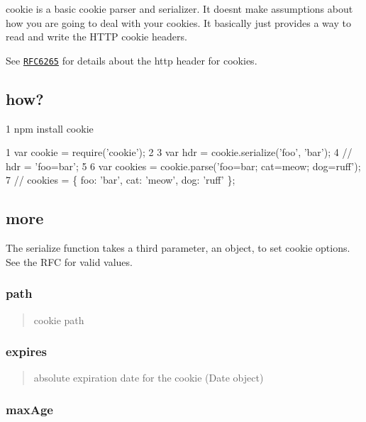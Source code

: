 cookie is a basic cookie parser and serializer. It doesn\textquotesingle{}t make assumptions about how you are going to deal with your cookies. It basically just provides a way to read and write the H\+T\+T\+P cookie headers.

See \href{http://tools.ietf.org/html/rfc6265}{\tt R\+F\+C6265} for details about the http header for cookies.

\subsection*{how?}


\begin{DoxyCode}
1 npm install cookie
\end{DoxyCode}



\begin{DoxyCode}
1 var cookie = require('cookie');
2 
3 var hdr = cookie.serialize('foo', 'bar');
4 // hdr = 'foo=bar';
5 
6 var cookies = cookie.parse('foo=bar; cat=meow; dog=ruff');
7 // cookies = \{ foo: 'bar', cat: 'meow', dog: 'ruff' \};
\end{DoxyCode}


\subsection*{more}

The serialize function takes a third parameter, an object, to set cookie options. See the R\+F\+C for valid values.

\subsubsection*{path}

\begin{quote}
cookie path \end{quote}


\subsubsection*{expires}

\begin{quote}
absolute expiration date for the cookie (Date object) \end{quote}


\subsubsection*{max\+Age}

